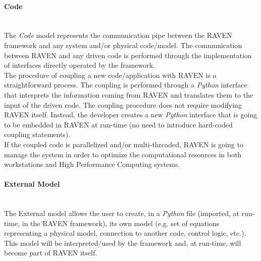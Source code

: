 \paragraph{Code} ~\\
The \textit{Code} model represents the communication pipe between the RAVEN framework and any system and/or 
physical code/model. The communication between RAVEN and any driven code is performed through the implementation 
of interfaces directly operated by the framework.
\\The procedure of coupling a new code/application with RAVEN is a straightforward process. The coupling is performed 
through a \textit{Python}  interface that interprets the information coming from RAVEN and translates them to the input of 
the driven code. The coupling procedure does not require modifying RAVEN itself. Instead, the developer creates a new 
\textit{Python} interface that is going to be embedded in RAVEN at run-time (no need to introduce hard-coded coupling 
statements). 
\\ If the coupled code is parallelized and/or multi-threaded, RAVEN is going to manage the system in order to optimize the 
computational resources in both workstations and High Performance Computing systems.

\paragraph{External Model} ~\\
The External model allows the user to create, in a \textit{Python} file (imported, at run-time, in the RAVEN framework), its 
own model (e.g. set of equations representing a physical model, connection to another code, control logic, etc.). This 
model will be interpreted/used by the framework and, at run-time, will become part of RAVEN itself.

